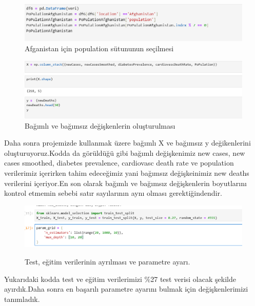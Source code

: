 \documentclass[12pt, a4paper]{article}
\begin{document}
\begin{figure}[!htbp] 
	
	\centering
	\includegraphics[angle=0, width=\textwidth]{8.png}
	\caption{Afganistan için population sütununun seçilmesi}
\end{figure}
\begin{figure}[!htbp] 
	
	\centering
	\includegraphics[angle=0, width=\textwidth]{9.png}
	\caption{Bağımlı ve bağımsız değişkenlerin oluşturulması}
\end{figure}
\newline
\newpage
Daha sonra projemizde kullanmak üzere bağımlı X ve bağımsız y değikenlerini oluşturuyoruz.Kodda da görüldüğü gibi bağımlı değişkenimiz new cases, new cases smoothed, diabetes prevalence, cardiovasc death rate ve population verilerimiz içerirken tahim edeceğimiz yani bağımsız değişkeinimiz new deaths verilerini içeriyor.En son olarak bağımlı ve bağımsız değişkenlerin boyutlarını kontrol etmemin sebebi satır sayılarının aynı olması gerektiğindendir.
\newline
\begin{figure}[!htbp] 
	
	\centering
	\includegraphics[angle=0, width=\textwidth]{10.png}
	\label{fig:yenietiket}
	\caption{Test, eğitim verilerinin ayrılması ve parametre ayarı.}
\end{figure}
\newline Yukarıdaki kodda test ve eğitim verilerimizi \%27 test verisi olacak şekilde ayırdık.Daha sonra en başarılı parametre ayarını bulmak için değişkenlerimizi tanımladık.
\end{document}
